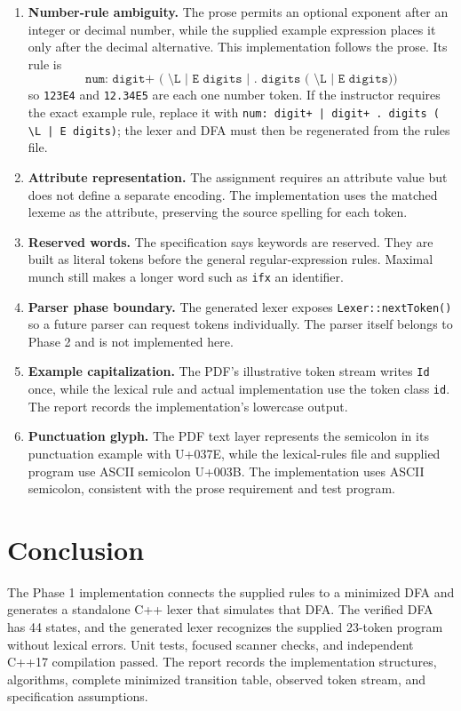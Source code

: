 \documentclass[11pt,a4paper]{article}
\newcommand{\code}[1]{\texttt{#1}}
\begin{document}
\begin{enumerate}
    \item \textbf{Number-rule ambiguity.} The prose permits an optional
    exponent after an integer or decimal number, while the supplied
    example expression places it only after the decimal alternative.
    This implementation follows the prose. Its rule is
    \[
        \code{num: digit+ ( \textbackslash L | E digits | . digits ( \textbackslash L | E digits))}
    \]
    so \code{123E4} and \code{12.34E5} are each one number token. If
    the instructor requires the exact example rule, replace it with
    \code{num: digit+ | digit+ . digits ( \textbackslash L | E digits)};
    the lexer and DFA must then be regenerated from the rules file.
    \item \textbf{Attribute representation.} The assignment requires
    an attribute value but does not define a separate encoding. The
    implementation uses the matched lexeme as the attribute, preserving
    the source spelling for each token.
    \item \textbf{Reserved words.} The specification says keywords are
    reserved. They are built as literal tokens before the general
    regular-expression rules. Maximal munch still makes a longer word
    such as \code{ifx} an identifier.
    \item \textbf{Parser phase boundary.} The generated lexer exposes
    \code{Lexer::nextToken()} so a future parser can request tokens
    individually. The parser itself belongs to Phase 2 and is not
    implemented here.
    \item \textbf{Example capitalization.} The PDF's illustrative token
    stream writes \code{Id} once, while the lexical rule and actual
    implementation use the token class \code{id}. The report records
    the implementation's lowercase output.
    \item \textbf{Punctuation glyph.} The PDF text layer represents
    the semicolon in its punctuation example with U+037E, while the
    lexical-rules file and supplied program use ASCII semicolon
    U+003B. The implementation uses ASCII semicolon, consistent with
    the prose requirement and test program.
\end{enumerate}

\section{Conclusion}

The Phase 1 implementation connects the supplied rules to a minimized
DFA and generates a standalone C++ lexer that simulates that DFA.
The verified DFA has 44 states, and the generated lexer recognizes the
supplied 23-token program without lexical errors. Unit tests, focused
scanner checks, and independent C++17 compilation passed. The report
records the implementation structures, algorithms, complete minimized
transition table, observed token stream, and specification assumptions.
\end{document}
